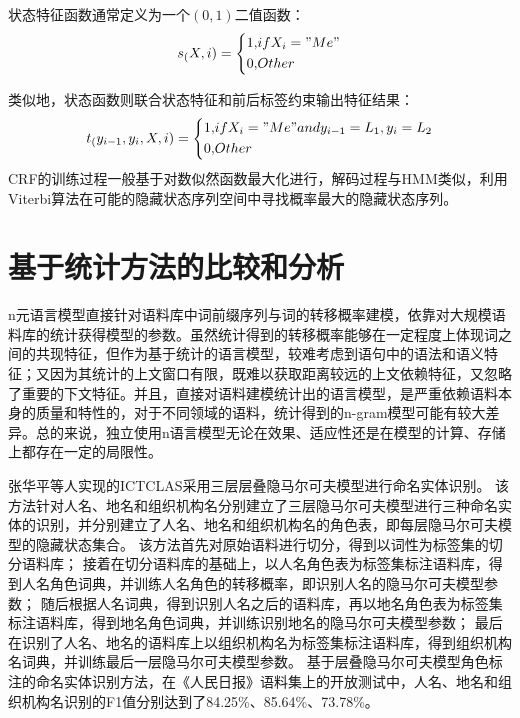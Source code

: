 状态特征函数通常定义为一个$(0,1)$二值函数：
\begin{equation}
    s_(X, i) = \left\{
        \begin{aligned}
            1, &if X_i = "Me"\\
            0, &Other
        \end{aligned}
    \right.
\end{equation}

类似地，状态函数则联合状态特征和前后标签约束输出特征结果：
\begin{equation}
    t_(y_{i-1}, y_i, X, i) = \left\{
        \begin{aligned}
            1, &if X_i = "Me" and y_{i-1} = L_1, y_i = L_2\\
            0, &Other
        \end{aligned}
    \right.
\end{equation}
CRF的训练过程一般基于对数似然函数最大化进行，解码过程与HMM类似，利用Viterbi算法在可能的隐藏状态序列空间中寻找概率最大的隐藏状态序列。

\section{基于统计方法的比较和分析}
n元语言模型直接针对语料库中词前缀序列与词的转移概率建模，依靠对大规模语料库的统计获得模型的参数。虽然统计得到的转移概率能够在一定程度上体现词之间的共现特征，但作为基于统计的语言模型，较难考虑到语句中的语法和语义特征；又因为其统计的上文窗口有限，既难以获取距离较远的上文依赖特征，又忽略了重要的下文特征。并且，直接对语料建模统计出的语言模型，是严重依赖语料本身的质量和特性的，对于不同领域的语料，统计得到的n-gram模型可能有较大差异。总的来说，独立使用n语言模型无论在效果、适应性还是在模型的计算、存储上都存在一定的局限性。

张华平等人实现的ICTCLAS采用三层层叠隐马尔可夫模型进行命名实体识别。
该方法针对人名、地名和组织机构名分别建立了三层隐马尔可夫模型进行三种命名实体的识别，并分别建立了人名、地名和组织机构名的角色表，即每层隐马尔可夫模型的隐藏状态集合。
该方法首先对原始语料进行切分，得到以词性为标签集的切分语料库；
接着在切分语料库的基础上，以人名角色表为标签集标注语料库，得到人名角色词典，并训练人名角色的转移概率，即识别人名的隐马尔可夫模型参数；
随后根据人名词典，得到识别人名之后的语料库，再以地名角色表为标签集标注语料库，得到地名角色词典，并训练识别地名的隐马尔可夫模型参数；
最后在识别了人名、地名的语料库上以组织机构名为标签集标注语料库，得到组织机构名词典，并训练最后一层隐马尔可夫模型参数。
基于层叠隐马尔可夫模型角色标注的命名实体识别方法，在《人民日报》语料集上的开放测试中，人名、地名和组织机构名识别的F1值分别达到了84.25\%、85.64\%、73.78\%。

